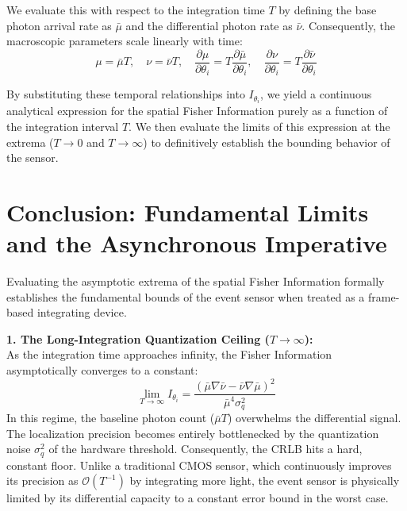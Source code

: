 \documentclass[11pt]{article}
\begin{document}
We evaluate this with respect to the integration time $T$ by defining the base photon arrival rate as $\bar{\mu}$ and the differential photon rate as $\bar{\nu}$. Consequently, the macroscopic parameters scale linearly with time:
\begin{equation}
\mu = \bar{\mu} T, \quad \nu = \bar{\nu} T, \quad \frac{\partial \mu}{\partial \theta_i} = T \frac{\partial \bar{\mu}}{\partial \theta_i}, \quad \frac{\partial \nu}{\partial \theta_i} = T \frac{\partial \bar{\nu}}{\partial \theta_i}
\end{equation}

By substituting these temporal relationships into $I_{\theta_i}$, we yield a continuous analytical expression for the spatial Fisher Information purely as a function of the integration interval $T$. We then evaluate the limits of this expression at the extrema ($T \to 0$ and $T \to \infty$) to definitively establish the bounding behavior of the sensor.

\section{Conclusion: Fundamental Limits and the Asynchronous Imperative}

Evaluating the asymptotic extrema of the spatial Fisher Information formally establishes the fundamental bounds of the event sensor when treated as a frame-based integrating device.

\vspace{0.5em}
\noindent \textbf{1. The Long-Integration Quantization Ceiling ($T \to \infty$):} \\
As the integration time approaches infinity, the Fisher Information asymptotically converges to a constant:
\begin{equation}
\lim_{T \to \infty} I_{\theta_i} = \frac{(\bar{\mu} \nabla \bar{\nu} - \bar{\nu} \nabla \bar{\mu})^2}{\bar{\mu}^4 \sigma_q^2}
\end{equation}
In this regime, the baseline photon count ($\bar{\mu}T$) overwhelms the differential signal. The localization precision becomes entirely bottlenecked by the quantization noise $\sigma_q^2$ of the hardware threshold. Consequently, the CRLB hits a hard, constant floor. Unlike a traditional CMOS sensor, which continuously improves its precision as $\mathcal{O}(T^{-1})$ by integrating more light, the event sensor is physically limited by its differential capacity to a constant error bound in the worst case.
\end{document}
